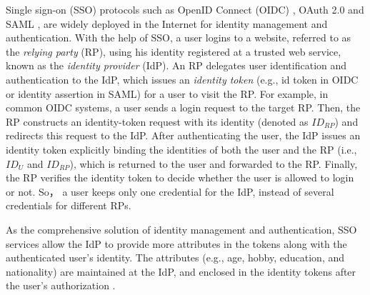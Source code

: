 Single sign-on (SSO) protocols such as OpenID Connect (OIDC) \cite{OpenIDConnect}, OAuth 2.0 \cite{rfc6749} and SAML \cite{SAML,SAMLIdentifier}, are widely deployed in the Internet for identity management and authentication.
With the help of SSO, a user logins to a website, referred to as the \emph{relying party} (RP), using his identity registered at a trusted web service, known as the \emph{identity provider} (IdP).
An RP delegates user identification and authentication to the IdP, which issues an \emph{identity token} (e.g., id token in OIDC or identity assertion in SAML) for a user to visit the RP. %
%
%
For example, in common OIDC systems, a user sends a login request to the target RP. %
Then, the RP constructs an identity-token request with its identity (denoted as $ID_{RP}$) and redirects this request to the IdP.
After authenticating the user,
 the IdP issues an identity token explicitly binding the identities of both the user and the RP (i.e., $ID_U$ and $ID_{RP}$),
    which is returned to the user and forwarded to the RP. %
Finally, the RP verifies the identity token to decide whether the user is allowed to login or not.
So， a user keeps only one credential for the IdP, instead of several credentials for different RPs.

As the comprehensive solution of identity management and authentication,
    SSO services allow the IdP to provide more attributes in the tokens
        along with the authenticated user's identity.
The attributes (e.g., age, hobby, education, and nationality) are maintained at the IdP,
    and enclosed in the identity tokens after the user's authorization \cite{OpenIDConnect,rfc6749}.

